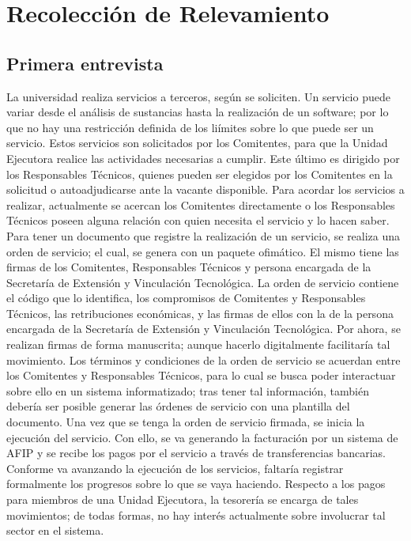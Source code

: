 \section[Recolecci\'on]{Recolecci\'on de Relevamiento}
\subsection{Primera entrevista}
\normalsize{ \indent
La universidad realiza servicios a terceros, seg\'un se
soliciten. Un servicio puede variar desde el an\'alisis
de sustancias hasta la realizaci\'on de un software;
por lo que no hay una restricci\'on definida de los
li\'imites sobre lo que puede ser un servicio.
}
\newline
\normalsize{ \indent
Estos servicios son solicitados por los Comitentes, para
que la Unidad Ejecutora realice las actividades necesarias
a cumplir. Este \'ultimo es dirigido por los Responsables
T\'ecnicos, quienes pueden ser elegidos por los Comitentes
en la solicitud o autoadjudicarse ante la vacante disponible.
}
\newline
\normalsize{ \indent
Para acordar los servicios a realizar, actualmente se
acercan los Comitentes directamente o los Responsables
T\'ecnicos poseen alguna relaci\'on con quien necesita
el servicio y lo hacen saber. Para tener un documento
que registre la realizaci\'on de un servicio, se realiza
una orden de servicio; el cual, se genera con un paquete
ofim\'atico. El mismo tiene las firmas de los Comitentes,
Responsables T\'ecnicos y persona encargada de la
Secretar\'ia de Extensi\'on y Vinculaci\'on Tecnol\'ogica.
}
\newline
\normalsize{ \indent
La orden de servicio contiene el c\'odigo que lo identifica,
los compromisos de Comitentes y Responsables T\'ecnicos,
las retribuciones econ\'omicas, y las firmas de ellos con
la de la persona encargada de la Secretar\'ia de
Extensi\'on y Vinculaci\'on Tecnol\'ogica. Por ahora,
se realizan firmas de forma manuscrita; aunque hacerlo
digitalmente facilitar\'ia tal movimiento.
}
\newline
\normalsize{ \indent
Los t\'erminos y condiciones de la orden de servicio
se acuerdan entre los Comitentes y Responsables T\'ecnicos,
para lo cual se busca poder interactuar sobre ello en
un sistema informatizado; tras tener tal informaci\'on,
tambi\'en deber\'ia ser posible generar las \'ordenes
de servicio con una plantilla del documento.
}
\newline
\normalsize{ \indent
Una vez que se tenga la orden de servicio firmada, se
inicia la ejecuci\'on del servicio. Con ello, se va
generando la facturaci\'on por un sistema de AFIP y
se recibe los pagos por el servicio a trav\'es de
transferencias bancarias. Conforme va avanzando la
ejecuci\'on de los servicios, faltar\'ia registrar
formalmente los progresos sobre lo que se vaya haciendo.
}
\newline
\normalsize{ \indent
Respecto a los pagos para miembros de una Unidad Ejecutora,
la tesorer\'ia se encarga de tales movimientos; de
todas formas, no hay inter\'es actualmente sobre
involucrar tal sector en el sistema.
}
